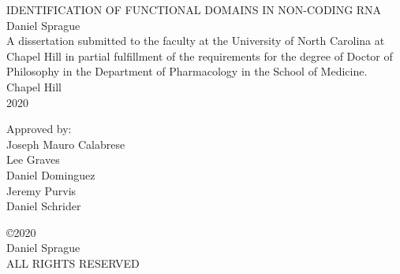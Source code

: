 \documentclass[11pt,letterpaper,twosided]{report}
\def\frontmatter{%
    \pagenumbering{roman}
    \setcounter{page}{2}
    \renewcommand{\thesection}{\Roman{section}}
}%
\begin{document}
\begin{titlepage}
   \begin{singlespacing}
   \begin{center}
       \textsc{IDENTIFICATION OF FUNCTIONAL DOMAINS IN NON-CODING RNA}\\
       \vspace{.95in}
       Daniel Sprague\\
       \vspace{.95in}
       A dissertation submitted to the faculty at the University of North Carolina at Chapel Hill in partial fulfillment of the requirements for the degree of Doctor of Philosophy in the Department of Pharmacology in the School of Medicine.\\
       \vspace{.95in}
       Chapel Hill\\
       2020
    \end{center}
    \vspace{.5in}
    \end{singlespacing}
    \begin{flushleft}
    \hspace{4.2in} Approved by:\\
     \hspace{4.2in}  Joseph Mauro Calabrese\\
     \hspace{4.2in}   Lee Graves\\
      \hspace{4.2in}  Daniel Dominguez\\
      \hspace{4.2in}  Jeremy Purvis\\
      \hspace{4.2in}   Daniel Schrider
      \end{flushleft}
\end{titlepage}
\frontmatter

\clearpage 
{}
\thispagestyle{plain}
\begin{center}
\begin{singlespace}
\copyright 2020\\
Daniel Sprague \\
\textsc{ALL RIGHTS RESERVED}
\end{singlespace}
\end{center}

\clearpage
\end{document}

